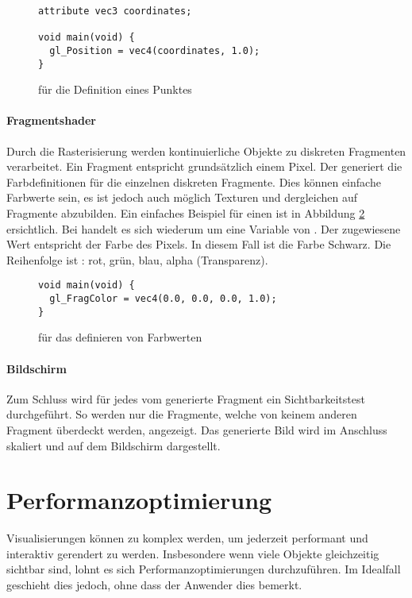 \begin{figure}[H]
\begin{lstlisting}[style=glsl]
attribute vec3 coordinates;

void main(void) {
  gl_Position = vec4(coordinates, 1.0);
}
\end{lstlisting}
\caption{ für die Definition eines Punktes}
\label{fig:vertexShader}
\end{figure}

\paragraph{Fragmentshader}
Durch die Rasterisierung werden kontinuierliche Objekte zu diskreten Fragmenten verarbeitet. Ein Fragment entspricht grundsätzlich einem Pixel. Der  generiert die Farbdefinitionen für die einzelnen diskreten Fragmente. Dies können einfache Farbwerte sein, es ist jedoch auch möglich Texturen und dergleichen auf Fragmente abzubilden. Ein einfaches Beispiel für einen  ist in Abbildung \ref{fig:fragmentShader} ersichtlich. Bei  handelt es sich wiederum um eine Variable von . Der zugewiesene Wert entspricht der Farbe des Pixels. In diesem Fall ist die Farbe Schwarz. Die Reihenfolge ist : rot, grün, blau, alpha (Transparenz).

\begin{figure}[H]
\begin{lstlisting}[style=glsl]
void main(void) {
  gl_FragColor = vec4(0.0, 0.0, 0.0, 1.0);
}
\end{lstlisting}
\caption{ für das definieren von Farbwerten}
\label{fig:fragmentShader}
\end{figure}


\paragraph{Bildschirm}
Zum Schluss wird für jedes vom  generierte Fragment ein Sichtbarkeitstest durchgeführt. So werden nur die Fragmente, welche von keinem anderen Fragment überdeckt werden, angezeigt. Das generierte Bild wird im Anschluss skaliert und auf dem Bildschirm dargestellt.


\section{Performanzoptimierung}
Visualisierungen können zu komplex werden, um jederzeit performant und interaktiv gerendert zu werden.
Insbesondere wenn viele Objekte gleichzeitig sichtbar sind, lohnt es sich Performanzoptimierungen durchzuführen.
Im Idealfall geschieht dies jedoch, ohne dass der Anwender dies bemerkt.

